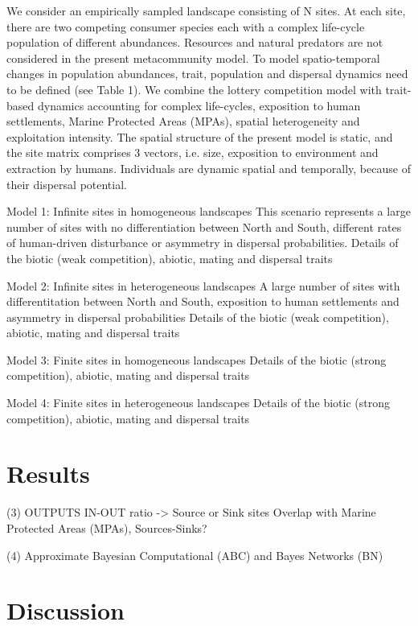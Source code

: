 \documentclass[12pt]{article}
\begin{document}
\begin{justify}
{{{{{We consider an empirically sampled landscape consisting of N sites. At each site, there are two competing consumer species each with a complex life-cycle population of different abundances. Resources and natural predators are not considered in the present metacommunity model. To model spatio-temporal changes in population abundances, trait, population and dispersal dynamics need to be defined (see Table 1). We combine the lottery competition model \citep{chesson1981environmental} with trait-based dynamics accounting for complex life-cycles, exposition to human settlements, Marine Protected Areas (MPAs), spatial heterogeneity and exploitation intensity. The spatial structure of the present model is static, and the site matrix comprises 3 vectors, i.e. size, exposition to environment and extraction by humans. Individuals are dynamic spatial and temporally, because of their dispersal potential.

Model 1: Infinite sites in homogeneous landscapes
This scenario represents a large number of sites with no differentiation between North and South, different rates of human-driven disturbance or asymmetry in dispersal probabilities. Details of the biotic (weak competition), abiotic, mating and dispersal traits

Model 2: Infinite sites in heterogeneous landscapes 
A large number of sites with differentitation between North and South, exposition to human settlements and asymmetry in dispersal probabilities
Details of the biotic (weak competition), abiotic, mating and dispersal traits

Model 3: Finite sites in homogeneous landscapes 
Details of the biotic (strong competition), abiotic, mating and dispersal traits

Model 4: Finite sites in heterogeneous landscapes 
Details of the biotic (strong competition), abiotic, mating and dispersal traits

\section{Results}

(3) OUTPUTS
IN-OUT ratio -> Source or Sink sites
Overlap with Marine Protected Areas (MPAs), Sources-Sinks?

(4) Approximate Bayesian Computational (ABC) and Bayes Networks (BN)

\section{Discussion}

}}}}}
\end{justify}
\end{document}
